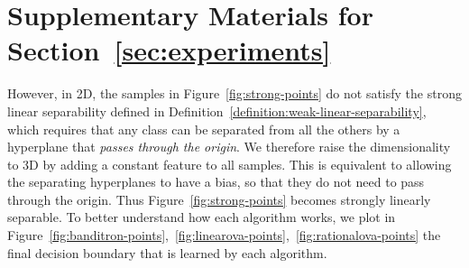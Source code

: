 \section{Supplementary Materials for Section~\ref{sec:experiments}}
\label{sec:supp-to-experiment}


However, in 2D, the samples in Figure~\ref{fig:strong-points} do not satisfy the strong linear separability defined in Definition~\ref{definition:weak-linear-separability}, which requires that any class can be separated from all the others by a hyperplane that \textit{passes through the origin}. We therefore raise the dimensionality to 3D by adding a constant feature to all samples. This is equivalent to allowing the separating hyperplanes to have a bias, so that they do not need to pass through the origin. Thus Figure~\ref{fig:strong-points} becomes strongly linearly separable. To better understand how each algorithm works, we plot in Figure~\ref{fig:banditron-points},~\ref{fig:linearova-points},~\ref{fig:rationalova-points} the final decision boundary that is learned by each algorithm.

